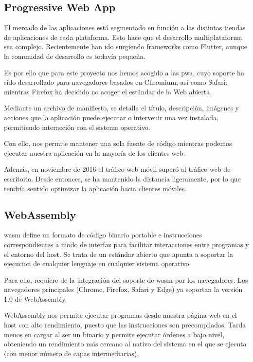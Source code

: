 \subsection{Progressive Web App}
\label{tec_hab:PWA}

El mercado de las aplicaciones está segmentado en función a las distintas tiendas de aplicaciones de cada plataforma. Esto hace que el desarrollo multiplataforma sea complejo. Recientemente han ido surgiendo frameworks como Flutter, aunque la comunidad de desarrollo es todavía pequeña.

Es por ello que para este proyecto nos hemos acogido a las \acrshort{pwa}, cuyo soporte ha sido desarrollado para navegadores basados en Chromium, así como Safari; mientras Firefox ha decidido no acoger el estándar de la Web abierta. \cite{firefoxNoPWA}

Mediante un archivo de manifiesto, se detalla el título, descripción, imágenes y acciones que la aplicación puede ejecutar o intervenir una vez instalada, permitiendo interacción con el sistema operativo.

Con ello, nos permite mantener una sola fuente de código mientras podemos ejecutar nuestra aplicación en la mayoría de los clientes web.

Además, en noviembre de 2016 el tráfico web móvil superó al tráfico web de escritorio. Desde entonces, se ha mantenido la distancia ligeramente, por lo que tendría sentido optimizar la aplicación hacia clientes móviles. \cite{movilTraficoMayor}

\subsection{WebAssembly}
\label{tec_hab:wam}


\acrfull{wasm} define un formato de código binario portable e instrucciones correspondientes a modo de interfaz para facilitar interacciones entre programas y el entorno del host. Se trata de un estándar abierto que apunta a soportar la ejecución de cualquier lenguaje en cualquier sistema operativo.

Para ello, requiere de la integración del soporte de \acrfull{wasm} por los navegadores. Los navegadores principales (Chrome, Firefox, Safari y Edge) ya soportan la versión 1.0 de WebAssembly.

WebAssembly nos permite ejecutar programas desde nuestra página web en el host con alto rendimiento, puesto que las instrucciones son precompiladas. Tarda menos en cargar al ser un binario y permite ejecutar órdenes a bajo nivel, obteniendo un rendimiento más cercano al nativo del sistema en el que se ejecuta (con menor número de capas intermediarias).

